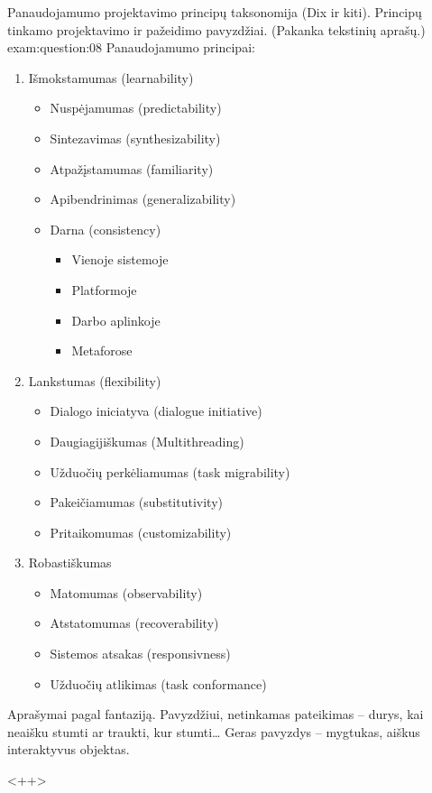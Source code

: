 \begin{question}{%
  Panaudojamumo projektavimo principų taksonomija (Dix ir kiti).
  Principų tinkamo projektavimo ir pažeidimo pavyzdžiai. (Pakanka
  tekstinių aprašų.)
  }{exam:question:08}
  Panaudojamumo principai:
  \begin{enumerate}
    \item Išmokstamumas (learnability)
      \begin{itemize}
        \item Nuspėjamumas (predictability)
        \item Sintezavimas (synthesizability)
        \item Atpažįstamumas (familiarity)
        \item Apibendrinimas (generalizability)
        \item Darna (consistency)
          \begin{itemize}
            \item Vienoje sistemoje
            \item Platformoje
            \item Darbo aplinkoje
            \item Metaforose
          \end{itemize}
      \end{itemize}
    \item Lankstumas (flexibility)
      \begin{itemize}
        \item Dialogo iniciatyva (dialogue initiative)
        \item Daugiagijiškumas (Multithreading)
        \item Užduočių perkėliamumas (task migrability)
        \item Pakeičiamumas (substitutivity)
        \item Pritaikomumas (customizability)
      \end{itemize}
    \item Robastiškumas
      \begin{itemize}
        \item Matomumas (observability)
        \item Atstatomumas (recoverability)
        \item Sistemos atsakas (responsivness)
        \item Užduočių atlikimas (task conformance)
      \end{itemize}
  \end{enumerate}
  
  Aprašymai pagal fantaziją. Pavyzdžiui, netinkamas pateikimas –
  durys, kai neaišku stumti ar traukti, kur stumti… Geras pavyzdys –
  mygtukas, aiškus interaktyvus objektas.
  
  <++>
\end{question}

